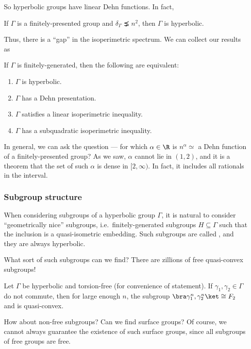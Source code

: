 \documentclass[a4paper]{article}
\begin{document}
So hyperbolic groups have linear Dehn functions. In fact,
\begin{thm} %
  If $\Gamma$ is a finitely-presented group and $\delta_\Gamma \precneq n^2$, then $\Gamma$ is hyperbolic.
\end{thm}
Thus, there is a ``gap'' in the isoperimetric spectrum. We can collect our results as
\begin{thm}
  If $\Gamma$ is finitely-generated, then the following are equivalent:
  \begin{enumerate}
    \item $\Gamma$ is hyperbolic.
    \item $\Gamma$ has a Dehn presentation.
    \item $\Gamma$ satisfies a linear isoperimetric inequality.
    \item $\Gamma$ has a subquadratic isoperimetric inequality.
  \end{enumerate}
\end{thm}

In general, we can ask the question --- for which $\alpha \in \R$ is $n^\alpha \simeq$ a Dehn function of a finitely-presented group? As we saw, $\alpha$ cannot lie in $(1, 2)$, and it is a theorem that the set of such $\alpha$ is dense in $[2, \infty)$. In fact, it includes all rationals in the interval.

  \subsubsection*{Subgroup structure}
When considering subgroups of a hyperbolic group $\Gamma$, it is natural to consider ``geometrically nice'' subgroups, i.e.\ finitely-generated subgroups $H \subseteq \Gamma$ such that the inclusion is a quasi-isometric embedding. Such subgroups are called , and they are always hyperbolic.

What sort of such subgroups can we find? There are zillions of free quasi-convex subgroups!
\begin{lemma}
  Let $\Gamma$ be hyperbolic and torsion-free (for convenience of statement). If $\gamma_1, \gamma_2 \in \Gamma$ do not commute, then for large enough $n$, the subgroup $\bra \gamma_1^n, \gamma_2^n\ket \cong F_2$ and is quasi-convex.
\end{lemma}
How about non-free subgroups? Can we find surface groups? Of course, we cannot always guarantee the existence of such surface groups, since all subgroups of free groups are free.
\end{document}
